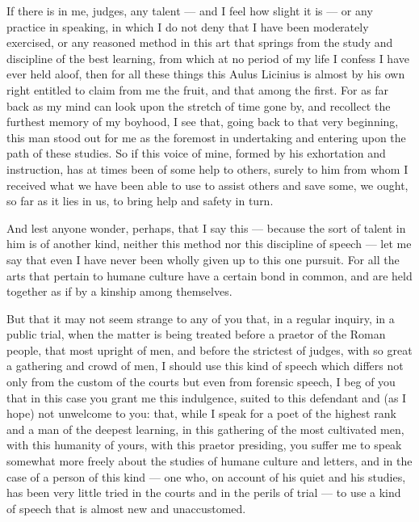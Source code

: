 
 If there is in me, judges, any talent --- and I feel how slight it is --- or any practice in speaking, in which I do not deny that I have been moderately exercised, or any reasoned method in this art that springs from the study and discipline of the best learning, from which at no period of my life I confess I have ever held aloof, then for all these things this Aulus Licinius is almost by his own right entitled to claim from me the fruit, and that among the first. For as far back as my mind can look upon the stretch of time gone by, and recollect the furthest memory of my boyhood, I see that, going back to that very beginning, this man stood out for me as the foremost in undertaking and entering upon the path of these studies. So if this voice of mine, formed by his exhortation and instruction, has at times been of some help to others, surely to him from whom I received what we have been able to use to assist others and save some, we ought, so far as it lies in us, to bring help and safety in turn.

 And lest anyone wonder, perhaps, that I say this --- because the sort of talent in him is of another kind, neither this method nor this discipline of speech --- let me say that even I have never been wholly given up to this one pursuit. For all the arts that pertain to humane culture have a certain bond in common, and are held together as if by a kinship among themselves.

 But that it may not seem strange to any of you that, in a regular inquiry, in a public trial, when the matter is being treated before a praetor of the Roman people, that most upright of men, and before the strictest of judges, with so great a gathering and crowd of men, I should use this kind of speech which differs not only from the custom of the courts but even from forensic speech, I beg of you that in this case you grant me this indulgence, suited to this defendant and (as I hope) not unwelcome to you: that, while I speak for a poet of the highest rank and a man of the deepest learning, in this gathering of the most cultivated men, with this humanity of yours, with this praetor presiding, you suffer me to speak somewhat more freely about the studies of humane culture and letters, and in the case of a person of this kind --- one who, on account of his quiet and his studies, has been very little tried in the courts and in the perils of trial --- to use a kind of speech that is almost new and unaccustomed.

